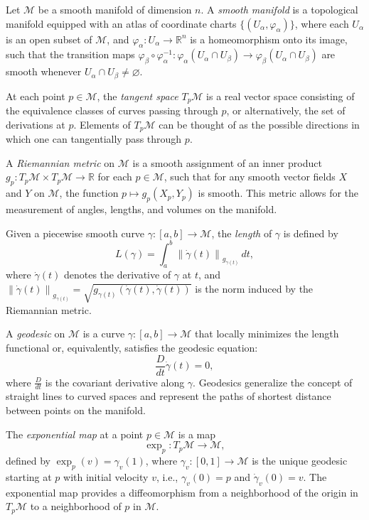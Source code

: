 \documentclass[a4paper,14pt]{article}
\renewcommand{\phi}{\ensuremath{\varphi}}
\renewcommand{\emptyset}{\varnothing}
\theoremstyle{plain} %
\theoremstyle{definition} %
\theoremstyle{remark} %
\begin{document}
	Let $\mathcal{M}$ be a smooth manifold of dimension $n$. A \emph{smooth manifold} is a topological manifold equipped with an atlas of coordinate charts $\{(U_\alpha, \phi_\alpha)\}$, where each $U_\alpha$ is an open subset of $\mathcal{M}$, and $\phi_\alpha: U_\alpha \rightarrow \mathbb{R}^n$ is a homeomorphism onto its image, such that the transition maps $\phi_{\beta} \circ \phi_{\alpha}^{-1}: \phi_{\alpha}(U_\alpha \cap U_\beta) \rightarrow \phi_{\beta}(U_\alpha \cap U_\beta)$ are smooth whenever $U_\alpha \cap U_\beta \neq \emptyset$.
	
	At each point $p \in \mathcal{M}$, the \emph{tangent space} $T_p\mathcal{M}$ is a real vector space consisting of the equivalence classes of curves passing through $p$, or alternatively, the set of derivations at $p$. Elements of $T_p\mathcal{M}$ can be thought of as the possible directions in which one can tangentially pass through $p$.
	
	A \emph{Riemannian metric} on $\mathcal{M}$ is a smooth assignment of an inner product $g_p: T_p\mathcal{M} \times T_p\mathcal{M} \rightarrow \mathbb{R}$ for each $p \in \mathcal{M}$, such that for any smooth vector fields $X$ and $Y$ on $\mathcal{M}$, the function $p \mapsto g_p(X_p, Y_p)$ is smooth. This metric allows for the measurement of angles, lengths, and volumes on the manifold.
	
	Given a piecewise smooth curve $\gamma: [a, b] \rightarrow \mathcal{M}$, the \emph{length} of $\gamma$ is defined by
	\[
	L(\gamma) = \int_a^b \left\| \dot{\gamma}(t) \right\|_{g_{\gamma(t)}} \, dt,
	\]
	where $\dot{\gamma}(t)$ denotes the derivative of $\gamma$ at $t$, and $\left\| \dot{\gamma}(t) \right\|_{g_{\gamma(t)}} = \sqrt{ g_{\gamma(t)}(\dot{\gamma}(t), \dot{\gamma}(t)) }$ is the norm induced by the Riemannian metric.
	
	A \emph{geodesic} on $\mathcal{M}$ is a curve $\gamma: [a, b] \rightarrow \mathcal{M}$ that locally minimizes the length functional or, equivalently, satisfies the geodesic equation:
	\[
	\frac{D}{dt} \dot{\gamma}(t) = 0,
	\]
	where $\frac{D}{dt}$ is the covariant derivative along $\gamma$. Geodesics generalize the concept of straight lines to curved spaces and represent the paths of shortest distance between points on the manifold.
	
	The \emph{exponential map} at a point $p \in \mathcal{M}$ is a map
	\[
	\exp_p: T_p\mathcal{M} \rightarrow \mathcal{M},
	\]
	defined by $\exp_p(v) = \gamma_v(1)$, where $\gamma_v: [0,1] \rightarrow \mathcal{M}$ is the unique geodesic starting at $p$ with initial velocity $v$, i.e., $\gamma_v(0) = p$ and $\dot{\gamma}_v(0) = v$. The exponential map provides a diffeomorphism from a neighborhood of the origin in $T_p\mathcal{M}$ to a neighborhood of $p$ in $\mathcal{M}$.
	
\end{document}
